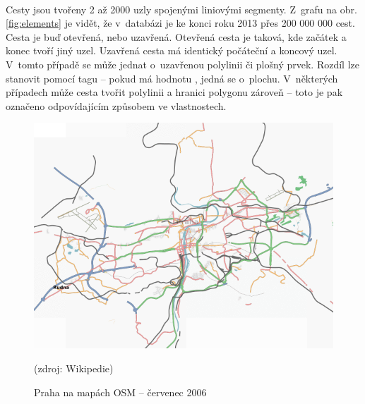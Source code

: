 \documentclass[11pt,a4paper,titlepage,oneside]{book}
\begin{document}

		\paragraph{} Cesty jsou tvořeny 2 až 2000 uzly spojenými liniovými segmenty. Z~grafu na obr. \ref{fig:elements} je vidět, že v~databázi je ke konci roku 2013 přes 200 000 000 cest.  Cesta je buď otevřená, nebo uzavřená. Otevřená cesta je taková, kde začátek a konec tvoří jiný uzel. Uzavřená cesta má identický počáteční a koncový uzel. V~tomto případě se může jednat o~uzavřenou polylinii či plošný prvek. Rozdíl lze stanovit pomocí tagu  -- pokud má hodnotu , jedná se o~plochu. V~některých případech může cesta tvořit polylinii a hranici polygonu zároveň -- toto je pak označeno odpovídajícím způsobem ve vlastnostech.

		\begin{figure}[!h]
			\begin{center}
				\includegraphics[width=12cm]{obrazky/Osm-200607-praha.png}
				\caption{Praha na mapách \ac{OSM} -- červenec 2006} (zdroj: Wikipedie\cite{osm_wikipedia_cs})
				\label{fig:praha2006}
			\end{center}
		\end{figure}



\end{document}
